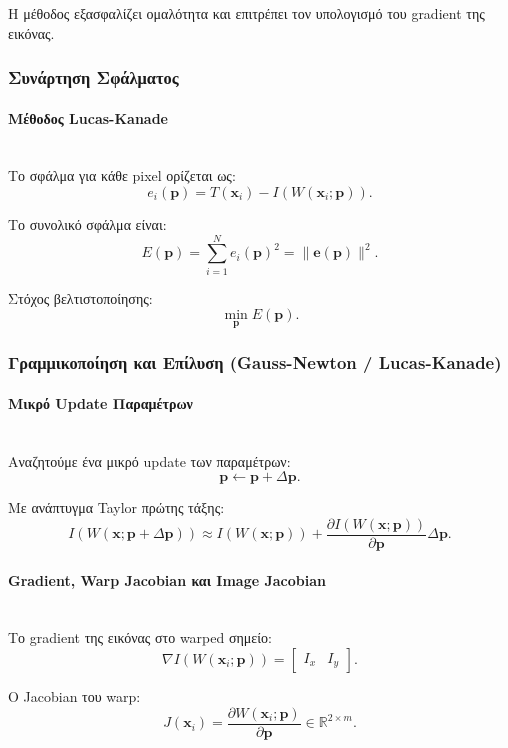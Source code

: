 \documentclass[12pt]{article}
\begin{document}
Η μέθοδος εξασφαλίζει ομαλότητα και επιτρέπει τον υπολογισμό του gradient της εικόνας.

\subsubsection{Συνάρτηση Σφάλματος}

\paragraph{Μέθοδος Lucas-Kanade}
\mbox{}\\
Το σφάλμα για κάθε pixel ορίζεται ως:
\[
e_i(\mathbf{p}) = T(\mathbf{x}_i) - I(W(\mathbf{x}_i;\mathbf{p})).
\]

Το συνολικό σφάλμα είναι:
\[
E(\mathbf{p}) = \sum_{i=1}^{N} e_i(\mathbf{p})^2
= \|\mathbf{e}(\mathbf{p})\|^2.
\]

Στόχος βελτιστοποίησης:
\[
\min_{\mathbf{p}} E(\mathbf{p}).
\]

\subsubsection{Γραμμικοποίηση και Επίλυση (Gauss-Newton / Lucas-Kanade)}

\paragraph{Μικρό Update Παραμέτρων}
\mbox{}\\
Αναζητούμε ένα μικρό update των παραμέτρων:
\[
\mathbf{p} \leftarrow \mathbf{p} + \Delta\mathbf{p}.
\]

Με ανάπτυγμα Taylor πρώτης τάξης:
\[
I(W(\mathbf{x};\mathbf{p}+\Delta\mathbf{p}))
\approx
I(W(\mathbf{x};\mathbf{p}))
+
\frac{\partial I(W(\mathbf{x};\mathbf{p}))}{\partial \mathbf{p}}
\Delta\mathbf{p}.
\]

\paragraph{Gradient, Warp Jacobian και Image Jacobian}
\mbox{}\\
Το gradient της εικόνας στο warped σημείο:
\[
\nabla I(W(\mathbf{x}_i;\mathbf{p})) =
\begin{bmatrix}
I_x & I_y
\end{bmatrix}.
\]

Ο Jacobian του warp:
\[
J(\mathbf{x}_i)=
\frac{\partial W(\mathbf{x}_i;\mathbf{p})}{\partial \mathbf{p}}
\in \mathbb{R}^{2\times m}.
\]
\end{document}
